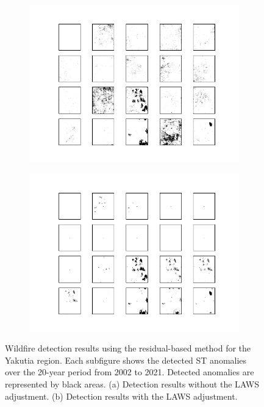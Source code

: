 \documentclass[11pt]{article}
\begin{document}
\begin{figure}[H]
     \centering
     
      \begin{subfigure}[b]{0.45\textwidth}
		\centering
		\includegraphics[width=\textwidth]{../figure/statistical_method_no_laws}
		\caption{}
	 \end{subfigure}
         \hfill
      \begin{subfigure}[b]{0.45\textwidth}
         \includegraphics[width=\textwidth]{../figure/statistical_method_laws}
         \caption{}
     \end{subfigure}
         \caption{Wildfire detection results using the residual-based method for the Yakutia region. Each subfigure shows the detected ST anomalies over the 20-year period from 2002 to 2021. Detected anomalies are represented by black areas. (a) Detection results without the LAWS adjustment. (b) Detection results with the LAWS adjustment.}
      \label{fig: statistical_method_real_data}
\end{figure}
\end{document}
